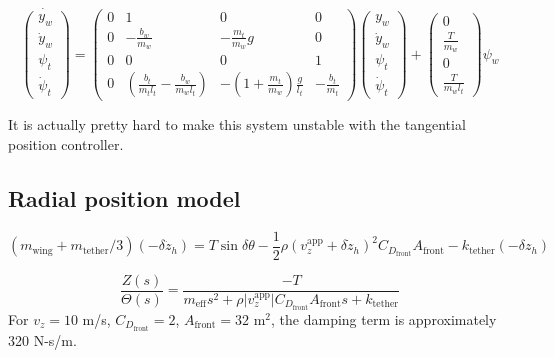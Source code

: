 \documentclass[11pt]{amsart}
\begin{document}
\begin{equation}
\dot{\left(
\begin{array}{c}
y_w \\
\dot{y}_w \\
\psi_t \\
\dot{\psi}_t
\end{array}
\right)}
=
\left(
\begin{array}{cccc}
0 & 1 & 0 & 0 \\
0 & -\frac{b_w}{m_w} & -\frac{m_t}{m_w}g & 0 \\
0 & 0 & 0 & 1 \\
0 & \left(\frac{b_t}{m_t l_t} - \frac{b_w}{m_w l_t}\right) &
-\left(1 + \frac{m_t}{m_w}\right) \frac{g}{l_t} &
-\frac{b_t}{m_t}
\end{array}
\right)
\left(
\begin{array}{c}
y_w \\
\dot{y}_w \\
\psi_t \\
\dot{\psi}_t
\end{array}
\right)
+
\left(
\begin{array}{c}
0 \\
\frac{T}{m_w} \\
0 \\
\frac{T}{m_w l_t}
\end{array}
\right)
\psi_w
\end{equation}

It is actually pretty hard to make this system unstable with the
tangential position controller.



\subsection{Radial position model}

\begin{equation}
(m_{\mathrm{wing}} + m_{\mathrm{tether}}/3)(-\delta \ddot{z}_h) =
T \sin \delta \theta -
\frac{1}{2} \rho (v^{\mathrm{app}}_z + \delta \dot{z}_h)^2
C_{D_{\mathrm{front}}} A_{\mathrm{front}} - k_{\mathrm{tether}} (-\delta z_h)
\end{equation}

\begin{equation}
\frac{Z(s)}{\Theta(s)} =
\frac{-T}{m_{\mathrm{eff}} s^2 + \rho |v^{\mathrm{app}}_z| C_{D_{\mathrm{front}}} A_{\mathrm{front}} s
+ k_{\mathrm{tether}}}
\end{equation}
For $v_z = 10$ m/s, $C_{D_{\mathrm{front}}} = 2$, $A_{\mathrm{front}} = 32$ m$^2$,
the damping term is approximately 320 N-s/m.
\end{document}
